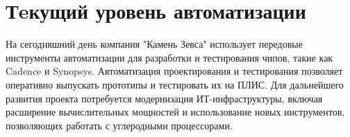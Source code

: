 \section{Тeкущий уровень автоматизации}

На сегодняшний день компания "Камень Зевса" использует передовые
инструменты автоматизации для разработки и тестирования чипов,
такие как Cadence и Synopsys.
Автоматизация проектирования
и тестирования позволяет оперативно выпускать прототипы
и тестировать их на ПЛИС.
Для дальнейшего развития проекта потребуется модернизация ИТ-инфраструктуры,
включая расширение вычислительных мощностей
и использование новых инструментов,
позволяющих работать с углеродными процессорами.

